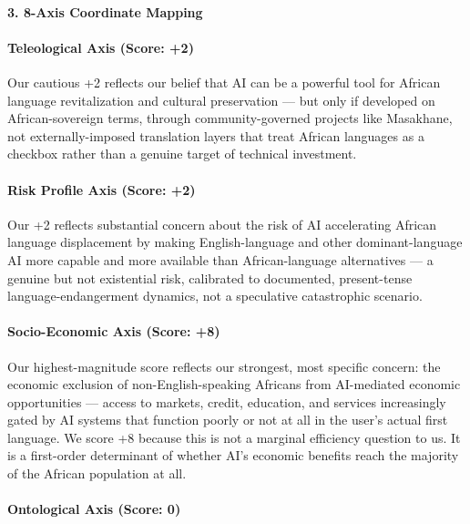 \paragraph{3. 8-Axis Coordinate
Mapping}\label{axis-coordinate-mapping-48}

\paragraph{Teleological Axis (Score:
+2)}\label{teleological-axis-score-2-6}

Our cautious +2 reflects our belief that AI can be a powerful tool for
African language revitalization and cultural preservation --- but only
if developed on African-sovereign terms, through community-governed
projects like Masakhane, not externally-imposed translation layers that
treat African languages as a checkbox rather than a genuine target of
technical investment.

\paragraph{Risk Profile Axis (Score:
+2)}\label{risk-profile-axis-score-2-1}

Our +2 reflects substantial concern about the risk of AI accelerating
African language displacement by making English-language and other
dominant-language AI more capable and more available than
African-language alternatives --- a genuine but not existential risk,
calibrated to documented, present-tense language-endangerment dynamics,
not a speculative catastrophic scenario.

\paragraph{Socio-Economic Axis (Score:
+8)}\label{socio-economic-axis-score-8-6}

Our highest-magnitude score reflects our strongest, most specific
concern: the economic exclusion of non-English-speaking Africans from
AI-mediated economic opportunities --- access to markets, credit,
education, and services increasingly gated by AI systems that function
poorly or not at all in the user's actual first language. We score +8
because this is not a marginal efficiency question to us. It is a
first-order determinant of whether AI's economic benefits reach the
majority of the African population at all.

\paragraph{Ontological Axis (Score:
0)}\label{ontological-axis-score-0-20}

